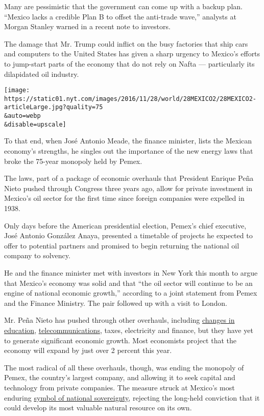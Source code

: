 Many are pessimistic that the government can come up with a backup plan.
``Mexico lacks a credible Plan B to offset the anti-trade wave,''
analysts at Morgan Stanley warned in a recent note to investors.

The damage that Mr. Trump could inflict on the busy factories that ship
cars and computers to the United States has given a sharp urgency to
Mexico's efforts to jump-start parts of the economy that do not rely on
Nafta --- particularly its dilapidated oil industry.

\texttt{[image: https://static01.nyt.com/images/2016/11/28/world/28MEXICO2/28MEXICO2-articleLarge.jpg?quality=75\\\&auto=webp\\\&disable=upscale]}

To that end, when José Antonio Meade, the finance minister, lists the
Mexican economy's strengths, he singles out the importance of the new
energy laws that broke the 75-year monopoly held by Pemex.

The laws, part of a package of economic overhauls that President Enrique
Peña Nieto pushed through Congress three years ago, allow for private
investment in Mexico's oil sector for the first time since foreign
companies were expelled in 1938.

Only days before the American presidential election, Pemex's chief
executive, José Antonio González Anaya, presented a timetable of
projects he expected to offer to potential partners and promised to
begin returning the national oil company to solvency.

He and the finance minister met with investors in New York this month to
argue that Mexico's economy was solid and that ``the oil sector will
continue to be an engine of national economic growth,'' according to a
joint statement from Pemex and the Finance Ministry. The pair followed
up with a visit to London.

Mr. Peña Nieto has pushed through other overhauls, including
\href{http://www.nytimes.com/2016/06/27/world/americas/mexico-teachers-protests-enrique-pena-nieto.html}{changes
in education},
\href{http://www.nytimes.com/2016/08/10/world/americas/mexicos-carlos-slim-helu.html?_r=0}{telecommunications},
taxes, electricity and finance, but they have yet to generate
significant economic growth. Most economists project that the economy
will expand by just over 2 percent this year.

The most radical of all these overhauls, though, was ending the monopoly
of Pemex, the country's largest company, and allowing it to seek capital
and technology from private companies. The measure struck at Mexico's
most enduring
\href{http://www.nytimes.com/2013/12/13/world/americas/mexico-oil.html}{symbol
of national sovereignty}, rejecting the long-held conviction that it
could develop its most valuable natural resource on its own.

